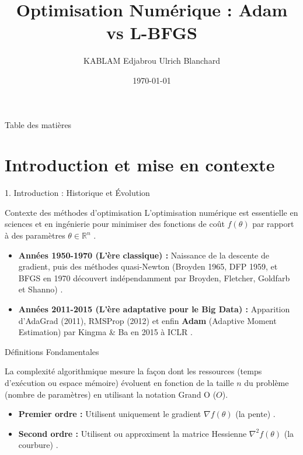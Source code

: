 \documentclass{beamer}
\title[Adam vs L-BFGS]{Optimisation Numérique : Adam vs L-BFGS}
\author[KABLAM]{KABLAM Edjabrou Ulrich Blanchard}
\institute[AMA]{Académie des Mathématiques Appliquées}
\date{\today}
\begin{document}
\begin{frame}
    \titlepage
\end{frame}

\begin{frame}{Table des matières}
    \tableofcontents
\end{frame}

\section{Introduction et mise en contexte}

\begin{frame}{1. Introduction : Historique et Évolution}
    \begin{block}{Contexte des méthodes d'optimisation}
        L'optimisation numérique est essentielle en sciences et en ingénierie pour minimiser des fonctions de coût $f(\theta)$ par rapport à des paramètres $\theta \in \mathbb{R}^n$ \cite{kingma2014adam}.
    \end{block}
    
    \begin{itemize}
        \item \textbf{Années 1950-1970 (L'ère classique) :} Naissance de la descente de gradient, puis des méthodes quasi-Newton (Broyden 1965, DFP 1959, et BFGS en 1970 découvert indépendamment par Broyden, Fletcher, Goldfarb et Shanno) \cite{gramfort_quasi_newton}.
        \item \textbf{Années 2011-2015 (L'ère adaptative pour le Big Data) :} Apparition d'AdaGrad (2011), RMSProp (2012) et enfin \textbf{Adam} (Adaptive Moment Estimation) par Kingma \& Ba en 2015 à ICLR \cite{kingma2014adam}.
    \end{itemize}
\end{frame}

\begin{frame}{Définitions Fondamentales}
    \begin{definition}
        La complexité algorithmique mesure la façon dont les ressources (temps d'exécution ou espace mémoire) évoluent en fonction de la taille $n$ du problème (nombre de paramètres) en utilisant la notation Grand O ($O$).
    \end{definition}

    \begin{definition}
        \begin{itemize}
            \item \textbf{Premier ordre :} Utilisent uniquement le gradient $\nabla f(\theta)$ (la pente) \cite{kingma2014adam}.
            \item \textbf{Second ordre :} Utilisent ou approximent la matrice Hessienne $\nabla^2 f(\theta)$ (la courbure) \cite{gramfort_quasi_newton}.
        \end{itemize}
    \end{definition}
\end{frame}
\end{document}
